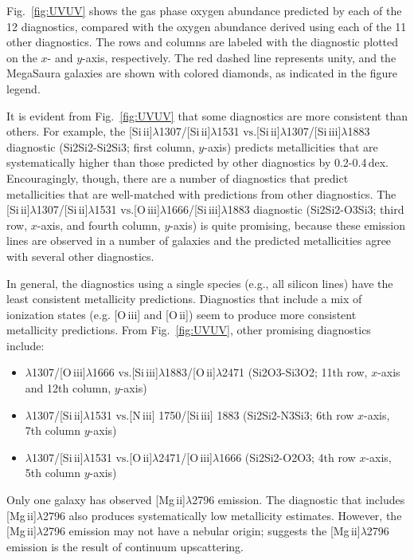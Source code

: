 \documentclass[preprint2]{aastex62}
\newcommand{\niii}{[N\,{\sc iii}]\xspace}
\newcommand{\oiii}{[O\,{\sc iii}]\xspace}
\newcommand{\oii}{[O\,{\sc ii}]\xspace}
\newcommand{\SiuII}{[Si\,{\sc ii}]\xspace}
\newcommand{\SiuIII}{[Si\,{\sc iii}]\xspace}
\newcommand{\mgii}{[Mg\,{\sc ii}]\xspace}
\newcommand\vs{\ensuremath{\mathrm{vs.}}\xspace}
\newcommand{\mage}{{\sc Meg}a{\sc S}a{\sc ura}\xspace}
\begin{document}
Fig.~\ref{fig:UVUV} shows the gas phase oxygen abundance predicted by each of the 12 diagnostics, compared with the oxygen abundance derived using each of the 11 other diagnostics. The rows and columns are labeled with the diagnostic plotted on the $x$- and $y$-axis, respectively. The red dashed line represents unity, and the \mage galaxies are shown with colored diamonds, as indicated in the figure legend.

It is evident from Fig.~\ref{fig:UVUV} that some diagnostics are more consistent than others. For example, the \SiuII$\lambda$1307/\SiuII$\lambda$1531 \vs \SiuII$\lambda$1307/\SiuIII$\lambda$1883 diagnostic (Si2Si2-Si2Si3; first column, $y$-axis) predicts metallicities that are systematically higher than those predicted by other diagnostics by 0.2-0.4\,dex. Encouragingly, though, there are a number of diagnostics that predict metallicities that are well-matched with predictions from other diagnostics. The \SiuII$\lambda$1307/\SiuII$\lambda$1531 \vs \oiii$\lambda$1666/\SiuIII$\lambda$1883 diagnostic (Si2Si2-O3Si3; third row, $x$-axis, and fourth column, $y$-axis) is quite promising, because these emission lines are observed in a number of galaxies and the predicted metallicities agree with several other diagnostics.

In general, the diagnostics using a single species (e.g., all silicon lines) have the least consistent metallicity predictions. Diagnostics that include a mix of ionization states (e.g. \oiii and \oii) seem to produce more consistent metallicity predictions. From Fig.~\ref{fig:UVUV}, other promising diagnostics include:
\begin{itemize}
    \item \SiuII$\lambda$1307/\oiii$\lambda$1666 \vs \SiuIII$\lambda$1883/\oii$\lambda$2471 (Si2O3-Si3O2; 11th row, $x$-axis and 12th column, $y$-axis)
    \item \SiuII$\lambda$1307/\SiuII$\lambda$1531 \vs \niii1750/\SiuIII1883 (Si2Si2-N3Si3; 6th row $x$-axis, 7th column $y$-axis)
    \item \SiuII$\lambda$1307/\SiuII$\lambda$1531 \vs \oii$\lambda$2471/\oiii$\lambda$1666 (Si2Si2-O2O3; 4th row $x$-axis, 5th column $y$-axis)
\end{itemize}

Only one galaxy has observed \mgii$\lambda$2796 emission. The diagnostic that includes \mgii$\lambda$2796 also produces systematically low metallicity estimates. However, the \mgii$\lambda$2796 emission may not have a nebular origin; \citet{Rigby+2018a} suggests the \mgii$\lambda$2796 emission is the result of continuum upscattering.
\end{document}
